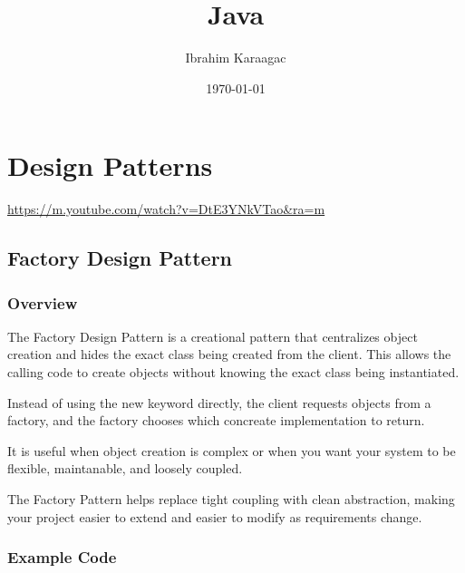 \documentclass[11pt]{article}
\author{Ibrahim Karaagac}
\date{\today}
\title{Java}
\begin{document}
\maketitle
\tableofcontents

\section{Design Patterns}
\label{sec:orge0be3fd}
\url{https://m.youtube.com/watch?v=DtE3YNkVTao\&ra=m}
\subsection{Factory Design Pattern}
\label{sec:org0681162}
\subsubsection{Overview}
\label{sec:orga2a28d0}
The Factory Design Pattern is a creational pattern that centralizes object creation and hides the exact class being created from the client. This allows the calling code to create objects without knowing the exact class being instantiated.

Instead of using the new keyword directly, the client requests objects from a factory, and the factory chooses which concreate implementation to return.

It is useful when object creation is complex or when you want your system to be flexible, maintanable, and loosely coupled.

The Factory Pattern helps replace tight coupling with clean abstraction, making your project easier to extend and easier to modify as requirements change.
\subsubsection{Example Code}
\label{sec:org372eb6d}
\end{document}
